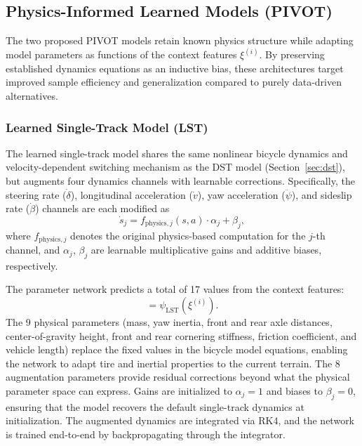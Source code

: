 \subsection{Physics-Informed Learned Models (PIVOT)}
\label{sec:physics-learned}

The two proposed PIVOT models retain known physics structure while adapting model parameters as functions of the context features $\xi^{(i)}$. By preserving established dynamics equations as an inductive bias, these architectures target improved sample efficiency and generalization compared to purely data-driven alternatives.

\subsubsection{Learned Single-Track Model (LST)}
\label{sec:lst}

The learned single-track model shares the same nonlinear bicycle dynamics and velocity-dependent switching mechanism as the DST model (Section~\ref{sec:dst}), but augments four dynamics channels with learnable corrections. Specifically, the steering rate ($\dot{\delta}$), longitudinal acceleration ($\dot{v}$), yaw acceleration ($\ddot{\psi}$), and sideslip rate ($\dot{\beta}$) channels are each modified as
\begin{equation}
  \dot{s}_j = f_{\text{physics},j}(s, a) \cdot \alpha_j + \beta_j,
  \label{eq:lst-augment}
\end{equation}
where $f_{\text{physics},j}$ denotes the original physics-based computation for the $j$-th channel, and $\alpha_j$, $\beta_j$ are learnable multiplicative gains and additive biases, respectively.

The parameter network predicts a total of 17 values from the context features:
\begin{equation}
  [\underbrace{m, I_z, l_f, l_r, h, C_{Sf}, C_{Sr}, \mu, L}_{\text{9 physical}},\;\; \underbrace{\alpha_1, \beta_1, \ldots, \alpha_4, \beta_4}_{\text{8 augmentation}}] = \psi_{\text{LST}}(\xi^{(i)}).
\end{equation}
The 9 physical parameters (mass, yaw inertia, front and rear axle distances, center-of-gravity height, front and rear cornering stiffness, friction coefficient, and vehicle length) replace the fixed values in the bicycle model equations, enabling the network to adapt tire and inertial properties to the current terrain. The 8 augmentation parameters provide residual corrections beyond what the physical parameter space can express. Gains are initialized to $\alpha_j = 1$ and biases to $\beta_j = 0$, ensuring that the model recovers the default single-track dynamics at initialization. The augmented dynamics are integrated via RK4, and the network is trained end-to-end by backpropagating through the integrator.

